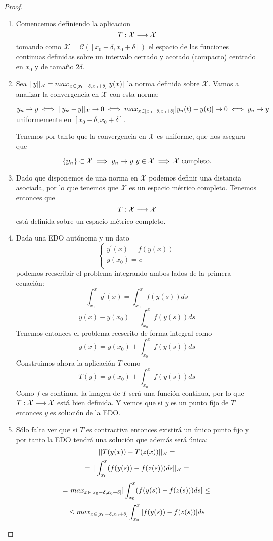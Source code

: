 \documentclass{mathnotes}
\begin{document}
\begin{proof}
\begin{enumerate}
\item Comencemos definiendo la aplicacion $$T: \mathcal{X} \longrightarrow \mathcal{X}$$ tomando como $\mathcal{X} = \mathcal{C}([x_0-\delta, x_0+\delta])$ el espacio de las funciones continuas definidas sobre un intervalo cerrado y acotado (compacto) centrado en $x_0$ y de tamaño $2\delta$.

\item Sea $||y||_\mathcal{X} = max_{x\in [x_0-\delta, x_0+\delta]} |y(x)|$ la norma definida sobre $\mathcal{X}$.
Vamos a analizar la convergencia en $\mathcal{X}$ con esta norma:

$y_n\to y \iff ||y_n-y||_\mathcal{X}\to 0 \iff max_{x\in [x_0-\delta, x_0+\delta]} |y_n(t)-y(t)|\to 0 \iff y_n\to y$ uniformemente en $[x_0-\delta, x_0+\delta]$.

Tenemos por tanto que la convergencia en $\mathcal{X}$ es uniforme, que nos asegura que 

$$\{ y_n \}\subset \mathcal{X}\implies y_n\to y\ y\in \mathcal{X} \implies \mathcal{X}\text{ completo.}$$

\item Dado que disponemos de una norma en $\mathcal{X}$ podemos definir una distancia asociada, por lo que tenemos que $\mathcal{X}$ es un espacio métrico completo. Tenemos entonces que $$T: \mathcal{X} \longrightarrow \mathcal{X}$$ está definida sobre un espacio métrico completo.

\item Dada una EDO autónoma y un dato 
$$
\left\lbrace
  \begin{array}{l}
     y^\prime(x) = f(y(x)) \\
     y(x_0) = c  \\
  \end{array}
  \right.
$$
podemos reescribir el problema integrando ambos lados de la primera ecuación:
$$\int_{x_0}^x y^\prime(x) = \int_{x_0}^x f(y(s))ds$$
$$ y(x) - y(x_0) = \int_{x_0}^x f(y(s))ds$$
Tenemos entonces el problema reescrito de forma integral como 
$$ y(x) = y(x_0) + \int_{x_0}^x f(y(s))ds$$
Construimos ahora la aplicación $T$ como
$$ T(y) = y(x_0) + \int_{x_0}^x f(y(s))ds$$
Como $f$ es continua, la imagen de $T$ será una función continua, por lo que $T: \mathcal{X} \longrightarrow \mathcal{X}$ está bien definida. Y vemos que si $y$ es un punto fijo de $T$ entonces $y$ es solución de la EDO.

\item Sólo falta ver que si $T$ es contractiva entonces existirá un único punto fijo y por tanto la EDO tendrá una solución que además será única:
$$||T(y(x)) - T(z(x))||_\mathcal{X} = $$
$$= ||\int_{x_0}^x (f(y(s)) - f(z(s)))ds||_\mathcal{X} = $$
$$= max_{x\in [x_0-\delta, x_0+\delta]} |\int_{x_0}^x (f(y(s)) - f(z(s)))ds| \leq $$
$$\leq max_{x\in [x_0-\delta, x_0+\delta]} \int_{x_0}^x |f(y(s)) - f(z(s))|ds$$


\end{enumerate}
\end{proof}
\end{document}
